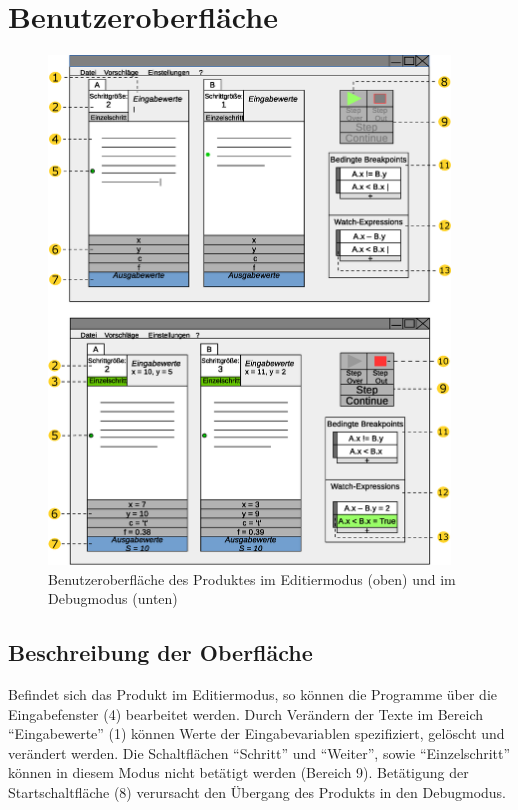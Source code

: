 \documentclass[parskip=full]{scrartcl}
\begin{document}
	
\newpage
\section{Benutzeroberfläche}
\begin{figure}[!ht] 
    \vspace{-10pt}
    \centering
       \includegraphics[width=0.95\textwidth]{skizzeFull_v2.eps}
       \caption{
         Benutzeroberfläche des Produktes im Editiermodus (oben) und im Debugmodus
         (unten)
       }
    \label{fig:Bild4}
\end{figure}

\newpage
    \subsection{Beschreibung der Oberfläche}
        Befindet sich das Produkt im \gls{Editiermodus}, so können die Programme über die 
        Eingabefenster (4) bearbeitet werden.
        Durch Verändern der Texte im Bereich \enquote{Eingabewerte} (1) können Werte der Eingabevariablen
        spezifiziert, gelöscht und verändert werden. 
        Die Schaltflächen \enquote{\gls{Schritt}} und \enquote{Weiter}, sowie \enquote{\gls{Einzelschritt}} können in diesem Modus nicht betätigt
        werden (Bereich 9). Betätigung der Startschaltfläche (8) verursacht den Übergang des Produkts in den Debugmodus.
        
\end{document}

